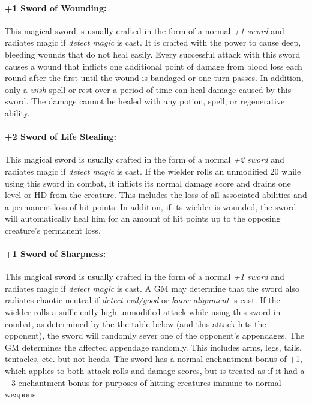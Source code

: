 \begin{multicols}{2}
\paragraph{+1 Sword of Wounding:} This magical sword is usually crafted in the form of a normal \textit{+1 sword} and radiates magic if \textit{detect magic} is cast.  It is crafted with the power to cause deep, bleeding wounds that do not heal easily.  Every successful attack with this sword causes a wound that inflicts one additional point of damage from blood loss each round after the first until the wound is bandaged or one turn passes.  In addition, only a \textit{wish} spell or rest over a period of time can heal damage caused by this sword.  The damage cannot be healed with any potion, spell, or regenerative ability.

\paragraph{+2 Sword of Life Stealing:} This magical sword is usually crafted in the form of a normal \textit{+2 sword} and radiates magic if \textit{detect magic} is cast.  If the wielder rolls an unmodified 20 while using this sword in combat, it inflicts its normal damage score and drains one level or HD from the creature.  This includes the loss of all associated abilities and a permanent loss of hit points.  In addition, if its wielder is wounded, the sword will automatically heal him for an amount of hit points up to the opposing creature's permanent loss.

\paragraph{+1 Sword of Sharpness:} This magical sword is usually crafted in the form of a normal \textit{+1 sword} and radiates magic if \textit{detect magic} is cast.  A GM may determine that the sword also radiates chaotic neutral if \textit{detect evil/good} or \textit{know alignment} is cast.  If the wielder rolls a sufficiently high unmodified attack while using this sword in combat, as determined by the the table below (and this attack hits the opponent), the sword will randomly sever one of the opponent's appendages.  The GM determines the affected appendage randomly.  This includes arms, legs, tails, tentacles, etc. but not heads.  The sword has a normal enchantment bonus of +1, which applies to both attack rolls and damage scores, but is treated as if it had a +3 enchantment bonus for purposes of hitting creatures immune to normal weapons.  


\end{multicols}
